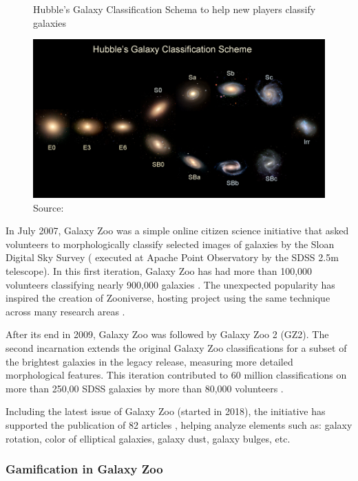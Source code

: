 \begin{figure}[ht]
    \centering
    \caption{Hubble's Galaxy Classification Schema to help new players classify galaxies}
    \includegraphics[width=0.8\linewidth]{images/background/galaxyzoo-training.jpg}
    \caption*{Source: \cite{galaxyzoo2010hubble}}
    \label{fig:galaxyzoo-hubble}
\end{figure}

In July 2007, Galaxy Zoo was a simple online citizen science initiative that asked volunteers to morphologically classify selected images of galaxies by the Sloan Digital Sky Survey (\cite{york2000sloan} executed at Apache Point Observatory by the SDSS 2.5m telescope). In this first iteration, Galaxy Zoo has had more than 100,000 volunteers classifying nearly 900,000 galaxies \cite{lintott2011galaxy}. The unexpected popularity has inspired the creation of Zooniverse, hosting project using the same technique across many research areas \cite{zooniverse2021galaxy}.

After its end in 2009, Galaxy Zoo was followed by Galaxy Zoo 2 (GZ2). The second incarnation extends the original Galaxy Zoo classifications for a subset of the brightest galaxies in the legacy release, measuring more detailed morphological features. This iteration contributed to 60 million classifications on more than 250,00 SDSS galaxies by more than 80,000 volunteers \cite{galaxyzoo22021volunteers}.

Including the latest issue of Galaxy Zoo (started in 2018), the initiative has supported the publication of 82 articles \cite{galaxyzoo2021publications}, helping analyze elements such as: galaxy rotation, color of elliptical galaxies, galaxy dust, galaxy bulges, etc.

\subsubsection{Gamification in Galaxy Zoo}

